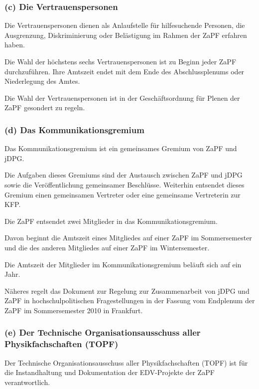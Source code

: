 \subsubsection*{(c) Die Vertrauenspersonen%
  \label{c-die-vertrauenspersonen}%
}

Die Vertrauenspersonen dienen als Anlaufstelle für hilfesuchende Personen, die
Ausgrenzung, Diskriminierung oder Belästigung im Rahmen der ZaPF erfahren haben.

Die Wahl der höchstens sechs Vertrauenspersonen ist zu Beginn jeder ZaPF durchzuführen.
Ihre Amtszeit endet mit dem Ende des Abschlussplenums oder Niederlegung des Amtes.

Die Wahl der Vertrauenspersonen ist in der Geschäftsordnung für Plenen der ZaPF
gesondert zu regeln.


\subsubsection*{(d) Das Kommunikationsgremium%
  \label{d-das-kommunikationsgremium}%
}

Das Kommunikationsgremium ist ein gemeinsames Gremium von ZaPF und jDPG.

Die Aufgaben dieses Gremiums sind der Austausch zwischen ZaPF und jDPG sowie
die Veröffentlichung gemeinsamer Beschlüsse.
Weiterhin entsendet dieses Gremium einen gemeinsamen Vertreter oder eine
gemeinsame Vertreterin zur KFP.

Die ZaPF entsendet zwei Mitglieder in das Kommunikationsgremium.

Davon beginnt die Amtszeit eines Mitgliedes auf einer ZaPF im Sommersemester und
die des anderen Mitgliedes auf einer ZaPF im Wintersemester.

Die Amtszeit der Mitglieder im Kommunikationsgremium beläuft sich auf ein Jahr.

Näheres regelt das Dokument zur \textquotedbl{}Regelung zur Zusammenarbeit von jDPG und ZaPF
in hochschulpolitischen Fragestellungen\textquotedbl{} in der Fassung vom Endplenum der ZaPF
im Sommersemester 2010 in Frankfurt.


\subsubsection*{(e) Der Technische Organisationsausschuss aller Physikfachschaften (TOPF)%
  \label{e-der-technische-organisationsausschuss-aller-physikfachschaften-topf}%
}

Der Technische Organisationsausschuss aller Physikfachschaften (TOPF) ist für
die Instandhaltung und Dokumentation der EDV-Projekte der ZaPF verantwortlich.

